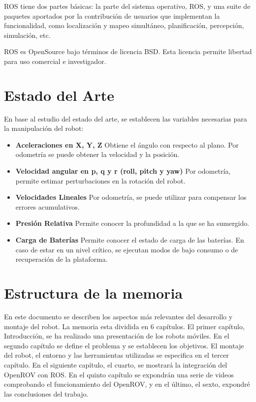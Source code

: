 ROS tiene dos partes básicas: la parte del sistema operativo, ROS, y una suite de paquetes aportados por la contribución de usuarios que implementan la funcionalidad, como localización y mapeo simultáneo, planificación, percepción, simulación, etc.

ROS es OpenSource bajo términos de licencia BSD. Esta licencia permite libertad para uso comercial e investigador.

\section{Estado del Arte}
\label{cap:Estado del Arte}
En base al estudio del estado del arte\cite{telemetria}, se establecen las variables necesarias para la manipulación del robot:
  \begin{itemize}
  \item \textbf{Aceleraciones en X, Y, Z} Obtiene el ángulo con respecto al plano. Por odometría se puede obtener la velocidad y la posición.
  \item \textbf{Velocidad angular en p, q y r (roll, pitch y yaw)} Por odometría, permite estimar perturbaciones en la rotación del robot.
  \item \textbf{Velocidades Lineales} Por odometría, se puede utilizar para compensar los errores acumulativos.
  \item \textbf{Presión Relativa} Permite conocer la profundidad a la que se ha sumergido.
  \item \textbf{Carga de Baterías} Permite conocer el estado de carga de las baterías. En caso de estar en un nivel crítico, se ejecutan modos de bajo consumo o de recuperación de la plataforma.
  \end{itemize}

\section{Estructura de la memoria}
\label{cap:estructuradelamemoria}
En este documento se describen los aspectos más relevantes del desarrollo y montaje del robot. La memoria esta dividida en 6 capítulos. 
El primer capítulo, Introducción, se ha realizado una presentación de los robots móviles. En el segundo capítulo se define el problema y se establecen los objetivos. El montaje del robot, el entorno y las herramientas utilizadas se especifica en el tercer capítulo. En el siguiente capítulo, el cuarto, se mostrará la integración del OpenROV con ROS. En el quinto capítulo se expondrán una serie de videos comprobando el funcionamiento del OpenROV, y en el último, el sexto, expondré las conclusiones del trabajo.
